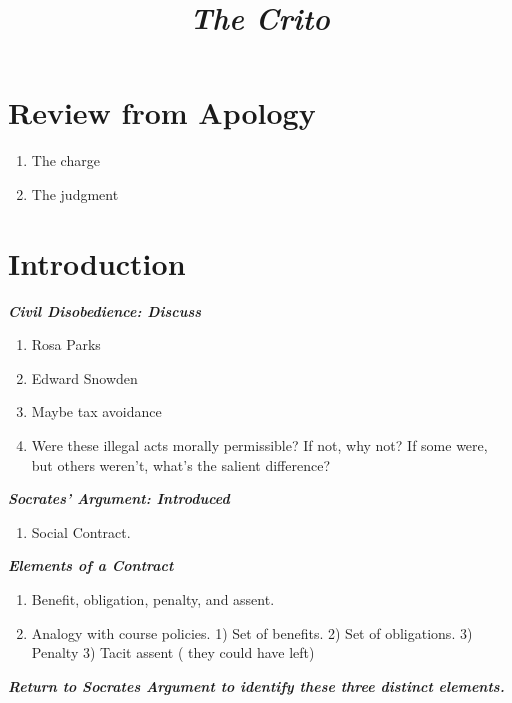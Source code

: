 \documentclass[]{article}
\title{\emph{The Crito}}
\date{}
\begin{document}
\maketitle

\section*{Review from Apology}

\begin{enumerate}
\def\labelenumi{\arabic{enumi}.}
\item
  The charge
\item
  The judgment
\end{enumerate}

\section*{Introduction}

\textbf{\emph{Civil Disobedience: Discuss}}

\begin{enumerate}
\def\labelenumi{\arabic{enumi}.}
\item
  Rosa Parks
\item
  Edward Snowden
\item
  Maybe tax avoidance
\item
  Were these illegal acts morally permissible? If not, why not? If some
  were, but others weren't, what's the salient difference?
\end{enumerate}

\textbf{\emph{Socrates' Argument: Introduced}}

\begin{enumerate}
\def\labelenumi{\arabic{enumi}.}
\item
  Social Contract.
\end{enumerate}

\textbf{\emph{Elements of a Contract}}

\begin{enumerate}
\def\labelenumi{\arabic{enumi}.}
\item
Benefit, obligation, penalty, and assent.
\item
  Analogy with course policies. 1) Set of benefits. 2) Set of
  obligations. 3) Penalty 3) Tacit assent ( they could have left)
\end{enumerate}

\textbf{\emph{Return to Socrates Argument to identify these three
distinct elements. }}
\end{document}
